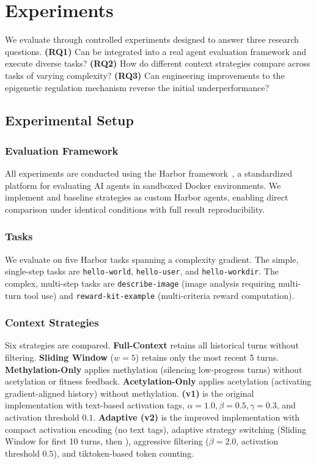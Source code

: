 \section{Experiments}

We evaluate \EpiContext{} through controlled experiments designed to answer three research questions. \textbf{(RQ1)} Can \EpiContext{} be integrated into a real agent evaluation framework and execute diverse tasks? \textbf{(RQ2)} How do different context strategies compare across tasks of varying complexity? \textbf{(RQ3)} Can engineering improvements to the epigenetic regulation mechanism reverse the initial underperformance?

\subsection{Experimental Setup}

\subsubsection{Evaluation Framework}

All experiments are conducted using the Harbor framework~\citep{harbor2026}, a standardized platform for evaluating AI agents in sandboxed Docker environments. We implement \EpiContext{} and baseline strategies as custom Harbor agents, enabling direct comparison under identical conditions with full result reproducibility.

\subsubsection{Tasks}

We evaluate on five Harbor tasks spanning a complexity gradient. The simple, single-step tasks are \texttt{hello-world}, \texttt{hello-user}, and \texttt{hello-workdir}. The complex, multi-step tasks are \texttt{describe-image} (image analysis requiring multi-turn tool use) and \texttt{reward-kit-example} (multi-criteria reward computation).

\subsubsection{Context Strategies}

Six strategies are compared. \textbf{Full-Context} retains all historical turns without filtering. \textbf{Sliding Window} ($w=5$) retains only the most recent 5 turns. \textbf{Methylation-Only} applies methylation (silencing low-progress turns) without acetylation or fitness feedback. \textbf{Acetylation-Only} applies acetylation (activating gradient-aligned history) without methylation. \textbf{\EpiContext{} (v1)} is the original implementation with text-based activation tags, $\alpha=1.0, \beta=0.5, \gamma=0.3$, and activation threshold $0.1$. \textbf{Adaptive \EpiContext{} (v2)} is the improved implementation with compact activation encoding (no text tags), adaptive strategy switching (Sliding Window for first 10 turns, then \EpiContext{}), aggressive filtering ($\beta=2.0$, activation threshold $0.5$), and tiktoken-based token counting.


